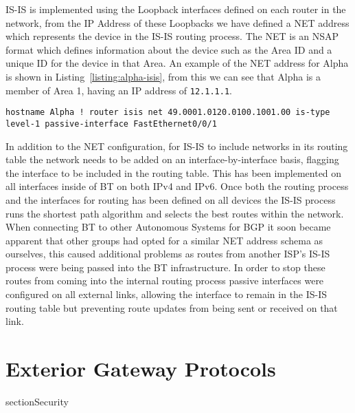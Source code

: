 IS-IS is implemented using the Loopback interfaces defined on each router in the
network, from the IP Address of these Loopbacks we have defined a NET address
which represents the device in the IS-IS routing process. The NET is an NSAP
format which defines information about the device such as the Area ID and a
unique ID for the device in that Area. An example of the NET address for Alpha
is shown in Listing~\ref{listing:alpha-isis}, from this we can see that Alpha is
a member of Area 1, having an IP address of \texttt{12.1.1.1}.

\begin{lstlisting}[caption={Alpha IS-IS Configuration}, label={listing:alpha-
isis}] hostname Alpha ! router isis net 49.0001.0120.0100.1001.00 is-type
level-1 passive-interface FastEthernet0/0/1 \end{lstlisting}

In addition to the NET configuration, for IS-IS to include networks in its
routing table the network needs to be added on an interface-by-interface basis,
flagging the interface to be included in the routing table. This has been
implemented on all interfaces inside of BT on both IPv4 and IPv6. Once both the
routing process and the interfaces for routing has been defined on all devices
the IS-IS process runs the shortest path algorithm and selects the best routes
within the network. When connecting BT to other Autonomous Systems for BGP it
soon became apparent that other groups had opted for a similar NET address
schema as ourselves, this caused additional problems as routes from another
ISP's IS-IS process were being passed into the BT infrastructure. In order to
stop these routes from coming into the internal routing process passive
interfaces were configured on all external links, allowing the interface to
remain in the IS-IS routing table but preventing route updates from being sent
or received on that link.

\section{Exterior Gateway Protocols} section{Security}

